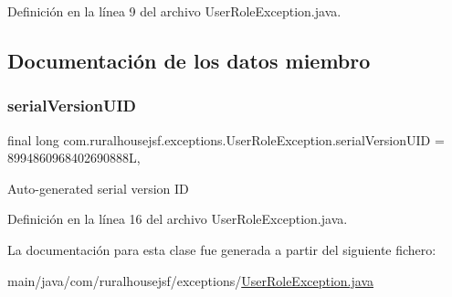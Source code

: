 Definición en la línea 9 del archivo User\+Role\+Exception.\+java.



\subsection{Documentación de los datos miembro}
\mbox{\label{classcom_1_1ruralhousejsf_1_1exceptions_1_1_user_role_exception_a9894bada17e7192af3bfcdd028fd6c57}} 
\subsubsection{\texorpdfstring{serialVersionUID}{serialVersionUID}}
{\footnotesize\ttfamily final long com.\+ruralhousejsf.\+exceptions.\+User\+Role\+Exception.\+serial\+Version\+U\+ID = 8994860968402690888L\hspace{0.3cm}{\ttfamily [static]}, {\ttfamily [private]}}

Auto-\/generated serial version ID 

Definición en la línea 16 del archivo User\+Role\+Exception.\+java.



La documentación para esta clase fue generada a partir del siguiente fichero\+:\begin{DoxyCompactItemize}
\item 
main/java/com/ruralhousejsf/exceptions/\mbox{\hyperlink{_user_role_exception_8java}{User\+Role\+Exception.\+java}}\end{DoxyCompactItemize}
